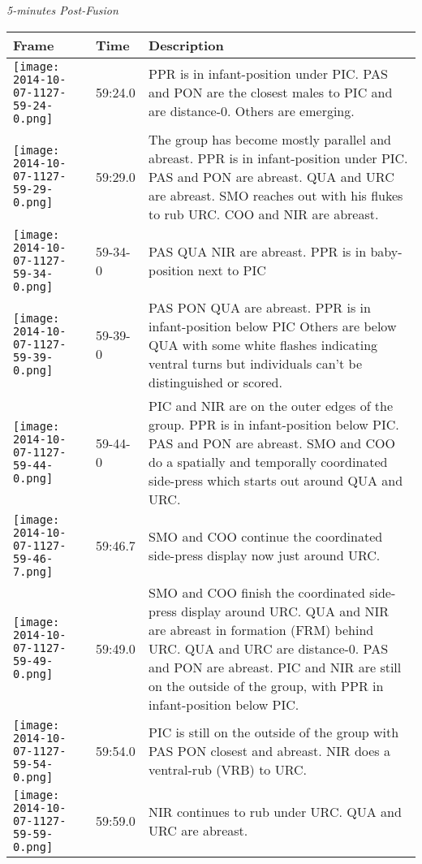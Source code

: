 \documentclass[11pt]{amsart}
\begin{document}
\noindent \textit{5-minutes Post-Fusion}
\begin{longtable}{| m{} | m{} | m{} |}
\hline
Frame & Time & Description \\ \hline
\texttt{[image: 2014-10-07-1127-59-24-0.png]} & 59:24.0 &  PPR is in infant-position under PIC. PAS and PON are the closest males to PIC and are distance-0. Others are emerging. \\ \hline
\texttt{[image: 2014-10-07-1127-59-29-0.png]} & 59:29.0 & The group has become mostly parallel and abreast. PPR is in infant-position under PIC. PAS and PON are abreast. QUA and URC are abreast. SMO reaches out with his flukes to rub URC. COO and NIR are abreast. \\ \hline
\texttt{[image: 2014-10-07-1127-59-34-0.png]} & 59-34-0 & PAS QUA NIR are abreast. PPR is in baby-position next to PIC  \\ \hline
\texttt{[image: 2014-10-07-1127-59-39-0.png]} & 59-39-0 &  PAS PON QUA are abreast. PPR is in infant-position below PIC Others are below QUA with some white flashes indicating ventral turns but individuals can't be distinguished or scored. \\ \hline
\texttt{[image: 2014-10-07-1127-59-44-0.png]} & 59-44-0 & PIC and NIR are on the outer edges of the group. PPR is in infant-position below PIC. PAS and PON are abreast. SMO and COO do a spatially and temporally coordinated side-press which starts out around QUA and URC. \\ \hline
\texttt{[image: 2014-10-07-1127-59-46-7.png]} & 59:46.7 & SMO and COO continue the coordinated side-press display now just around URC. \\ \hline
\texttt{[image: 2014-10-07-1127-59-49-0.png]} & 59:49.0 & SMO and COO finish the coordinated side-press display around URC. QUA and NIR are abreast in formation (FRM) behind URC. QUA and URC are distance-0. PAS and PON are abreast. PIC and NIR are still on the outside of the group, with PPR in infant-position below PIC. \\ \hline
\texttt{[image: 2014-10-07-1127-59-54-0.png]} & 59:54.0 & PIC is still on the outside of the group with PAS PON closest and abreast. NIR does a ventral-rub (VRB) to URC.  \\ \hline
\texttt{[image: 2014-10-07-1127-59-59-0.png]} & 59:59.0 & NIR continues to rub under URC. QUA and URC are abreast. \\ \hline

\end{longtable}
\end{document}
